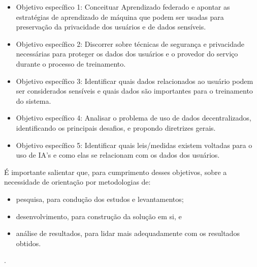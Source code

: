 \begin{itemize}
    \item Objetivo específico 1: Conceituar Aprendizado federado e apontar as estratégias de aprendizado de máquina que podem ser usadas para preservação da privacidade dos usuários e de dados sensíveis.
    \item Objetivo específico 2: Discorrer sobre técnicas de segurança e privacidade necessárias para proteger os dados dos usuários e o provedor do serviço durante o processo de treinamento.
    \item Objetivo específico 3: Identificar quais dados relacionados ao usuário podem ser considerados sensíveis e quais dados são importantes para o treinamento do sistema.
    \item Objetivo específico 4: Analisar o problema de uso de dados decentralizados, identificando os principais desafios, e propondo diretrizes gerais.
    \item Objetivo específico 5: Identificar quais leis/medidas existem voltadas para o uso de IA’s e como elas se relacionam com os dados dos usuários.
\end{itemize}

É importante salientar que, para cumprimento desses objetivos, sobre a necessidade de orientação por metodologias de:
\begin{itemize}
    \item pesquisa, para condução dos estudos e levantamentos;
    \item desenvolvimento, para construção da solução em si, e
    \item análise de resultados, para lidar mais adequadamente com os resultados obtidos.
\end{itemize}
.
